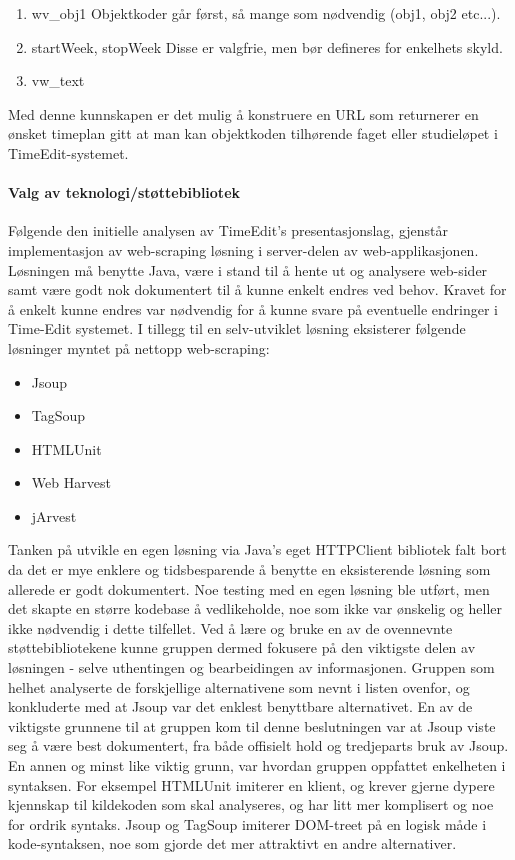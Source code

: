 \documentclass[../main.tex]{subfiles}
\begin{document}
\begin{enumerate}
\item wv\_obj1
Objektkoder går først, så mange som nødvendig (obj1, obj2 etc...).
\item startWeek, stopWeek
Disse er valgfrie, men bør defineres for enkelhets skyld.
\item vw\_text
\end{enumerate}

Med denne kunnskapen er det mulig å konstruere en URL som returnerer en ønsket timeplan gitt at man kan objektkoden tilhørende faget eller studieløpet i TimeEdit-systemet. 

\paragraph{Valg av teknologi/støttebibliotek}

Følgende den initielle analysen av TimeEdit’s presentasjonslag, gjenstår implementasjon av web-scraping løsning i server-delen av web-applikasjonen.  Løsningen må benytte Java, være i stand til å hente ut og analysere web-sider samt være godt nok dokumentert til å kunne enkelt endres ved behov. Kravet for å enkelt kunne endres var nødvendig for å kunne svare på eventuelle endringer i Time-Edit systemet.
I tillegg til en selv-utviklet løsning eksisterer følgende løsninger myntet på nettopp web-scraping:

\begin{itemize}
\item Jsoup
\item TagSoup
\item HTMLUnit
\item Web Harvest
\item jArvest
\end{itemize}

Tanken på utvikle en egen løsning via Java’s eget HTTPClient bibliotek falt bort da det er mye enklere og tidsbesparende å benytte en eksisterende løsning som allerede er godt dokumentert. Noe testing med en egen løsning ble utført, men det skapte en større kodebase å vedlikeholde, noe som ikke var ønskelig og heller ikke nødvendig i dette tilfellet. Ved å lære og bruke en av de ovennevnte støttebibliotekene kunne gruppen dermed fokusere på den viktigste delen av løsningen - selve uthentingen og bearbeidingen av informasjonen.\newline
\newline
Gruppen som helhet analyserte de forskjellige alternativene som nevnt i listen ovenfor, og konkluderte med at Jsoup var det enklest benyttbare alternativet. En av de viktigste grunnene til at gruppen kom til denne beslutningen var at Jsoup viste seg å være best dokumentert, fra både offisielt hold og tredjeparts bruk av Jsoup.
En annen og minst like viktig grunn, var hvordan gruppen oppfattet enkelheten i syntaksen. For eksempel HTMLUnit imiterer en klient, og krever gjerne dypere kjennskap til kildekoden som skal analyseres, og har litt mer komplisert og noe for ordrik syntaks. Jsoup og TagSoup imiterer DOM-treet på en logisk måde i kode-syntaksen, noe som gjorde det mer attraktivt en andre alternativer.
\end{document}
